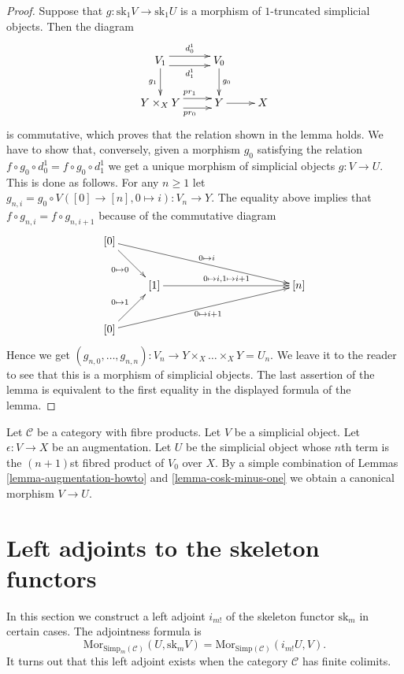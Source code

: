 \begin{proof}
Suppose that $g : \text{sk}_1V \to \text{sk}_1U$ is a morphism of
$1$-truncated simplicial objects. Then the diagram
$$
\xymatrix{
V_1 \ar@<1ex>[r]^{d^1_0} \ar@<-1ex>[r]_{d^1_1} \ar[d]_{g_1} &
V_0 \ar[d]^{g_0} & \\
Y\times_X Y \ar@<1ex>[r]^{pr_1} \ar@<-1ex>[r]_{pr_0} &
Y \ar[r] & X
}
$$
is commutative, which proves that the relation shown in
the lemma holds. We have to show that,
conversely, given a morphism $g_0$ satisfying the relation
$f \circ g_0 \circ d^1_0 = f \circ g_0 \circ d^1_1$
we get a unique morphism of simplicial objects $g : V \to U$.
This is done as follows. For any $n \geq 1$ let
$g_{n, i} = g_0 \circ V([0] \to [n], 0 \mapsto i) :
V_n \to Y$. The equality above implies that
$f \circ g_{n, i} = f \circ g_{n, i + 1}$ because of
the commutative diagram
$$
\xymatrix{
[0] \ar[rd]_{0 \mapsto 0} \ar[rrrrrd]^{0 \mapsto i} & & & & &\\
& [1] \ar[rrrr]^{0 \mapsto i, 1\mapsto i + 1} & & & &[n] \\
[0] \ar[ru]^{0 \mapsto 1} \ar[rrrrru]_{0 \mapsto i + 1} & & & & &
}
$$
Hence we get
$(g_{n, 0}, \ldots, g_{n, n}) : V_n \to Y\times_X\ldots\times_X Y = U_n$.
We leave it to the reader to see that this is a morphism of simplicial
objects. The last assertion of the lemma is equivalent to the
first equality in the displayed formula of the lemma.
\end{proof}

\begin{remark}
\label{remark-augmentation}
Let $\mathcal{C}$ be a category with fibre products.
Let $V$ be a simplicial object.
Let $\epsilon : V \to X$ be an augmentation.
Let $U$ be the simplicial object whose $n$th term
is the $(n + 1)$st fibred product of $V_0$ over $X$.
By a simple combination of
Lemmas \ref{lemma-augmentation-howto} and \ref{lemma-cosk-minus-one}
we  obtain a canonical morphism
$V \to U$.
\end{remark}





\section{Left adjoints to the skeleton functors}
\label{section-adjoint-left}

\noindent
In this section we construct a left adjoint $i_{m!}$
of the skeleton functor $\text{sk}_m$ in certain cases.
The adjointness formula is
$$
\text{Mor}_{\text{Simp}_m(\mathcal{C})}(U, \text{sk}_mV)
=
\text{Mor}_{\text{Simp}(\mathcal{C})}(i_{m!}U, V).
$$
It turns out that this left adjoint exists when
the category $\mathcal{C}$ has finite colimits.

